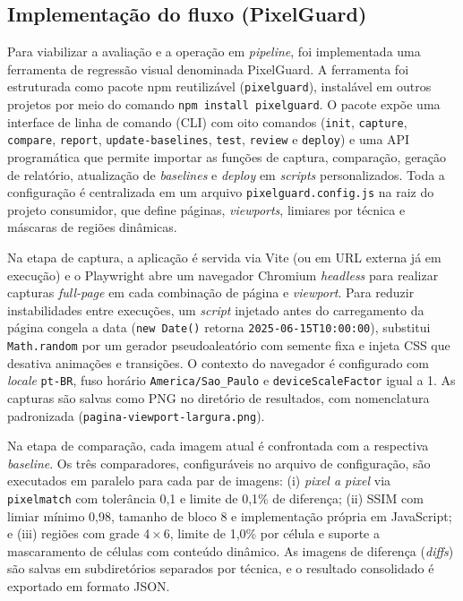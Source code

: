 \documentclass{UNESC}
\begin{document}
\subsection{Implementação do fluxo (PixelGuard)}
Para viabilizar a avaliação e a operação em \emph{pipeline}, foi implementada uma ferramenta de regressão visual denominada PixelGuard. A ferramenta foi estruturada como pacote npm reutilizável (\texttt{pixelguard}), instalável em outros projetos por meio do comando \texttt{npm install pixelguard}. O pacote expõe uma interface de linha de comando (CLI) com oito comandos (\texttt{init}, \texttt{capture}, \texttt{compare}, \texttt{report}, \texttt{update-baselines}, \texttt{test}, \texttt{review} e \texttt{deploy}) e uma API programática que permite importar as funções de captura, comparação, geração de relatório, atualização de \emph{baselines} e \emph{deploy} em \emph{scripts} personalizados. Toda a configuração é centralizada em um arquivo \texttt{pixelguard.config.js} na raiz do projeto consumidor, que define páginas, \emph{viewports}, limiares por técnica e máscaras de regiões dinâmicas.

Na etapa de captura, a aplicação é servida via Vite (ou em URL externa já em execução) e o Playwright abre um navegador Chromium \emph{headless} para realizar capturas \emph{full-page} em cada combinação de página e \emph{viewport}. Para reduzir instabilidades entre execuções, um \emph{script} injetado antes do carregamento da página congela a data (\texttt{new Date()} retorna \texttt{2025-06-15T10:00:00}), substitui \texttt{Math.random} por um gerador pseudoaleatório com semente fixa e injeta CSS que desativa animações e transições. O contexto do navegador é configurado com \emph{locale} \texttt{pt-BR}, fuso horário \texttt{America/Sao\_Paulo} e \texttt{deviceScaleFactor} igual a 1. As capturas são salvas como PNG no diretório de resultados, com nomenclatura padronizada (\texttt{pagina-viewport-largura.png}).

Na etapa de comparação, cada imagem atual é confrontada com a respectiva \emph{baseline}. Os três comparadores, configuráveis no arquivo de configuração, são executados em paralelo para cada par de imagens: (i) \emph{pixel a pixel} via \texttt{pixelmatch} com tolerância 0,1 e limite de 0,1\% de diferença; (ii) SSIM com limiar mínimo 0,98, tamanho de bloco 8 e implementação própria em JavaScript; e (iii) regiões com grade 4\,$\times$\,6, limite de 1,0\% por célula e suporte a mascaramento de células com conteúdo dinâmico. As imagens de diferença (\emph{diffs}) são salvas em subdiretórios separados por técnica, e o resultado consolidado é exportado em formato JSON.
\end{document}
